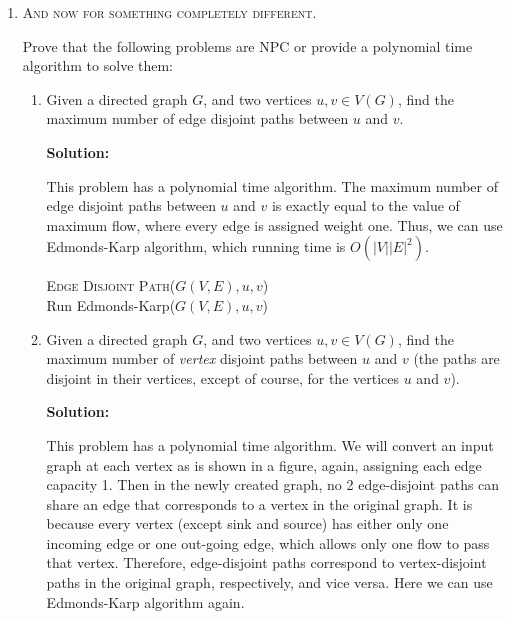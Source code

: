 \documentclass[11pt]{article}
\begin{document}
\begin{enumerate}
    \item \textsc{And now for something completely
       different.}\\
    
    Prove that the following problems are NPC or provide a
    polynomial time algorithm to solve them:
    \begin{enumerate}
        \item Given a directed graph $G$, and two vertices
        $u,v \in V(G)$, find the maximum number of edge
        disjoint paths between $u$ and $v$.
        
        {\bf Solution:}
        
        This problem has a polynomial time algorithm. The
        maximum number of edge disjoint paths between $u$
        and $v$ is exactly equal to the value of maximum
        flow, where every edge is assigned weight one. Thus,
        we can use Edmonds-Karp algorithm, which running
        time is $O(|V||E|^2)$.
        
        \begin{center}
            \begin{algorithm}
                \textsc{Edge Disjoint Path($G(V,E),u,v$)}\+\\
                Run Edmonds-Karp($G(V,E),u,v$)
            \end{algorithm}         
        \end{center}
        
        \item Given a directed graph $G$, and two vertices
        $u,v \in V(G)$, find the maximum number of
        \emph{vertex} disjoint paths between $u$ and $v$
        (the paths are disjoint in their vertices, except of
        course, for the vertices $u$ and $v$).
        
        {\bf Solution:}
        
        This problem has a polynomial time algorithm. We
        will convert an input graph at each vertex as is
        shown in a figure, again, assigning each edge
        capacity 1. Then in the newly created graph, no 2
        edge-disjoint paths can share an edge that
        corresponds to a vertex in the original graph. It is
        because every vertex (except sink and source) has
        either only one incoming edge or one out-going edge,
        which allows only one flow to pass that vertex.
        Therefore, edge-disjoint paths correspond to
        vertex-disjoint paths in the original graph,
        respectively, and vice versa.  Here we can use
        Edmonds-Karp algorithm again.
        

\end{enumerate}
\end{enumerate}
\end{document}
